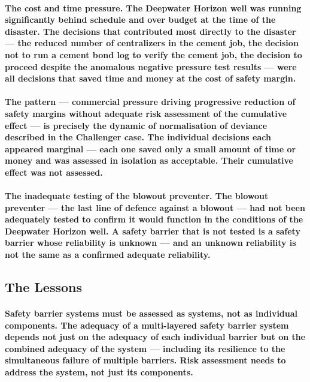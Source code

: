 \paragraph{\textbf{The cost and time pressure}. The Deepwater Horizon well was running significantly behind schedule and over budget at the time of the disaster. The decisions that contributed most directly to the disaster — the reduced number of centralizers in the cement job, the decision not to run a cement bond log to verify the cement job, the decision to proceed despite the anomalous negative pressure test results — were all decisions that saved time and money at the cost of safety margin.}
\paragraph{The pattern — commercial pressure driving progressive reduction of safety margins without adequate risk assessment of the cumulative effect — is precisely the dynamic of normalisation of deviance described in the Challenger case. The individual decisions each appeared marginal — each one saved only a small amount of time or money and was assessed in isolation as acceptable. Their cumulative effect was not assessed.}
\paragraph{\textbf{The inadequate testing of the blowout preventer}. The blowout preventer — the last line of defence against a blowout — had not been adequately tested to confirm it would function in the conditions of the Deepwater Horizon well. A safety barrier that is not tested is a safety barrier whose reliability is unknown — and an unknown reliability is not the same as a confirmed adequate reliability.}

\subsection{The Lessons}
\paragraph{\textbf{Safety barrier systems must be assessed as systems}, not as individual components. The adequacy of a multi-layered safety barrier system depends not just on the adequacy of each individual barrier but on the combined adequacy of the system — including its resilience to the simultaneous failure of multiple barriers. Risk assessment needs to address the system, not just its components.}
